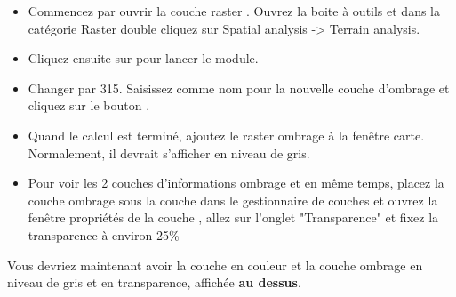 {\begin{itemize}[label=--]
\item Commencez par ouvrir la couche raster . Ouvrez la boite à outils \grass et dans la catégorie Raster double cliquez sur Spatial
analysis -> Terrain analysis.
\item Cliquez ensuite sur  pour lancer le module. 
\item Changer  par 315. Saisissez  comme nom pour la nouvelle couche d'ombrage et cliquez sur le bouton .
\item Quand le calcul est terminé, ajoutez le raster ombrage à la fenêtre carte. Normalement, il devrait s'afficher en niveau de gris.
\item Pour voir les 2 couches d'informations ombrage et  en même temps, placez la couche ombrage sous la couche  dans le gestionnaire de couches et ouvrez la fenêtre propriétés de la couche , allez sur l'onglet "Transparence" et fixez la transparence à environ 25\%
\end{itemize}

Vous devriez maintenant avoir la couche  en couleur et la couche ombrage en niveau de gris et en transparence, affichée \textbf{au dessus}.

}

